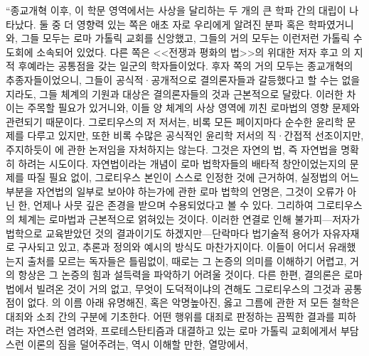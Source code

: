 ``종교개혁 이후,
이 학문 영역에서는
사상을 달리하는 두 개의 큰 학파 간의 대립이 나타났다.
둘 중 더 영향력 있는 쪽은 애초
자로 우리에게 알려진 분파 혹은 학파였거니와,
그들 모두는 로마 가톨릭 교회를 신앙했고,
그들의 거의 모두는 이런저런 가톨릭 수도회에 소속되어 있었다.
다른 쪽은
<<전쟁과 평화의 법>>의 위대한 저자
후고 의 지적 후예라는 공통점을 갖는
일군의 학자들이었다.
후자 쪽의 거의 모두는 종교개혁의 추종자들이었으니,
그들이 공식적^^b7공개적으로 결의론자들과 갈등했다고 할 수는 없을지라도,
그들 체계의 기원과 대상은 결의론자들의 것과 근본적으로 달랐다.
이러한 차이는 주목할 필요가 있거니와,
이들 양 체계의 사상 영역에 끼친 로마법의 영향 문제와 관련되기 때문이다.
그로티우스의 저 저서는,
비록 모든 페이지마다 순수한 윤리학 문제를 다루고 있지만,
또한 비록 수많은 공식적인 윤리학 저서의 직^^b7간접적 선조이지만,
주지하듯이 에 관한 논저임을 자처하지는 않는다.
그것은 자연의 법,
즉 자연법을 명확히 하려는 시도이다.
자연법이라는 개념이 로마 법학자들의 배타적 창안이었는지의
문제를 따질 필요 없이,
그로티우스 본인이 스스로 인정한 것에 근거하여,
실정법의 어느 부분을 자연법의 일부로 보아야 하는가에 관한
로마 법학의 언명은,
그것이 오류가 아닌 한,
언제나
사뭇 깊은 존경을 받으며 수용되었다고
볼 수 있다.
그리하여 그로티우스의 체계는
로마법과 근본적으로 얽혀있는 것이다.
이러한 연결로 인해 불가피---저자가 법학으로 교육받았던 것의
결과이기도 하겠지만---단락마다
법기술적 용어가 자유자재로 구사되고 있고,
추론과
정의와 예시의 방식도 마찬가지이다.
이들이 어디서 유래했는지 출처를 모르는 독자들은 틀림없이,
때로는 그 논증의 의미를 이해하기 어렵고,
거의 항상은 그 논증의 힘과 설득력을 파악하기 어려울 것이다.
다른 한편,
결의론은 로마법에서 빌려온 것이 거의 없고,
무엇이 도덕적이냐의 견해도 그로티우스의 그것과 공통점이 없다.
의 이름 아래 유명해진, 혹은 악명높아진, 옳고 그름에 관한 저 모든 철학은
대죄와
소죄 간의 구분에 기초한다.
어떤 행위를 대죄로 판정하는 끔찍한 결과를 피하려는 자연스런 염려와,
프로테스탄티즘과 대결하고 있는 로마 가톨릭 교회에게서
부담스런 이론의 짐을 덜어주려는, 역시 이해할 만한, 열망에서,
